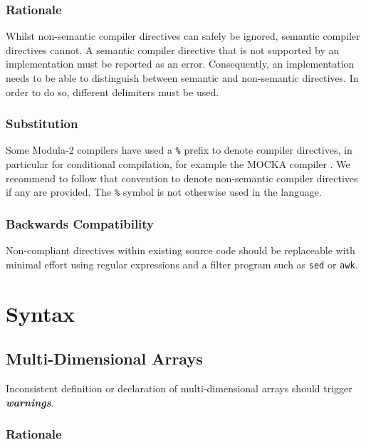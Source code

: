 \documentclass[10pt,a4paper]{article}
\renewcommand{\emph}[1]{\textbf{\textit{#1}}}
\begin{document}
\subsubsection{Rationale}

Whilst \glspl{non-semantic compiler directive} can safely be ignored,
\glspl{semantic compiler directive} cannot. A \gls{semantic compiler directive}
that is not supported by an implementation must be reported as an error.
Consequently, an implementation needs to be able to distinguish between
semantic and non-semantic directives. In order to do so, different delimiters
must be used.

\subsubsection{Substitution}

Some Modula-2 compilers have used a \verb|%|
prefix to denote \glspl{compiler directive}, in particular for conditional
compilation, for example the  MOCKA compiler \cite{MOCKA}. We recommend to
follow that convention to denote \glspl{non-semantic compiler directive}
if any are provided. The \verb|%|
symbol is not otherwise used in the language.

\subsubsection{Backwards Compatibility}

Non-compliant directives within existing source code should be replaceable with
minimal effort using regular expressions and a filter program such as
\verb|sed| or \verb|awk|. 


\section{Syntax}

\subsection{Multi-Dimensional Arrays}

Inconsistent definition or declaration of multi-dimensional arrays should
trigger \emph{warnings}.

\subsubsection{Rationale}
\end{document}
